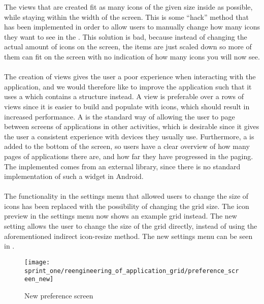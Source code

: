 The  views that are created fit as many icons of the given size inside as possible, while staying within the width of the screen. This is some ``hack'' method that has been implemented in order to allow users to manually change how many icons they want to see in the \launcher. This solution is bad, because instead of changing the actual amount of icons on the screen, the items are just scaled down so more of them can fit on the screen with no indication of how many icons you will now see.
\\\\
The creation of  views gives the user a poor experience when interacting with the application, and we would therefore like to improve the \launcher application such that it uses a  which contains a  structure instead. A  view is preferable over a rows of  views since it is easier to build and populate with icons, which should result in increased performance. A  is the standard way of allowing the user to page between screens of applications in other \launcher activities, which is desirable since it gives the user a consistent experience with devices they usually use. Furthermore, a  is added to the bottom of the screen, so users have a clear overview of how many pages of applications there are, and how far they have progressed in the paging. The implemented  comes from an external library\parencite{view_pager_indicator_avianey}, since there is no standard implementation of such a widget in Android.
\\\\
The functionality in the settings menu that allowed users to change the size of icons has been replaced with the possibility of changing the \launcher grid size. The icon preview in the settings menu now shows an example grid instead. The new setting allows the user to change the size of the grid directly, instead of using the aforementioned indirect icon-resize method. The new settings menu can be seen in .

\begin{figure}[!htbp]
    \centering
    \texttt{[image: sprint\_one/reengineering\_of\_application\_grid/preference\_screen\_new]}
    \caption{New preference screen}
    \label{fig:preference_screen_new}
\end{figure}
